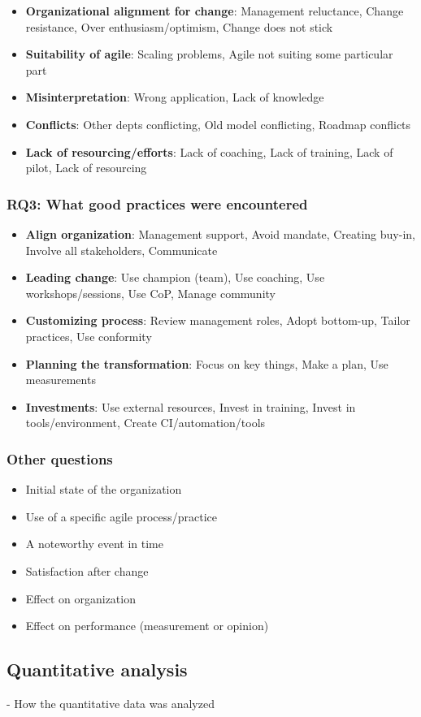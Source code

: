 \begin{itemize}
  \item \textbf{Organizational alignment for change}: Management reluctance, Change resistance, Over enthusiasm/optimism, Change does not stick
  \item \textbf{Suitability of agile}: Scaling problems, Agile not suiting some particular part
  \item \textbf{Misinterpretation}: Wrong application, Lack of knowledge
  \item \textbf{Conflicts}: Other depts conflicting, Old model conflicting, Roadmap conflicts
  \item \textbf{Lack of resourcing/efforts}: Lack of coaching, Lack of training, Lack of pilot, Lack of resourcing
\end{itemize}


\subsubsection*{RQ3: What good practices were encountered}

\begin{itemize}
  \item \textbf{Align organization}: Management support, Avoid mandate, Creating buy-in, Involve all stakeholders, Communicate
  \item \textbf{Leading change}: Use champion (team), Use coaching, Use workshops/sessions, Use CoP, Manage community
  \item \textbf{Customizing process}: Review management roles, Adopt bottom-up, Tailor practices, Use conformity
  \item \textbf{Planning the transformation}: Focus on key things, Make a plan, Use measurements
  \item \textbf{Investments}: Use external resources, Invest in training, Invest in tools/environment, Create CI/automation/tools
\end{itemize}


\subsubsection*{Other questions}

\begin{itemize}
  \item Initial state of the organization
  \item Use of a specific agile process/practice
  \item A noteworthy event in time
  \item Satisfaction after change
  \item Effect on organization
  \item Effect on performance (measurement or opinion)
\end{itemize}


\subsection{Quantitative analysis}
- How the quantitative data was analyzed
